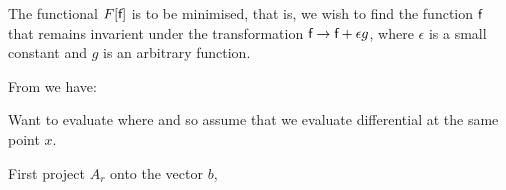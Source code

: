 








The functional $F[{\textsf {f}}]$ is to be minimised,
that is, we wish to find the function ${\textsf {f}}$ that remains invarient
under the transformation ${\textsf {f}} \rightarrow {\textsf {f}} + \epsilon g$, where
$\epsilon$ is a small constant and $g$ is an arbitrary function.



From \cite{Lasenby1993} we have:

Want to evaluate
where
and so assume that we evaluate differential at the same point $x$.

First project $A_r$ onto the vector $b$,


